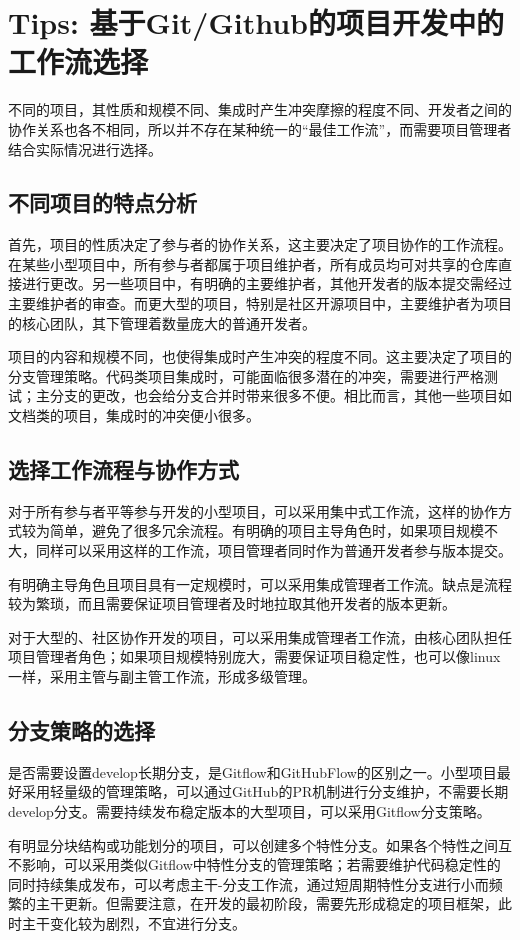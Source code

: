 \documentclass[../main.tex]{subfiles}
\begin{document}
\section{Tips: 基于Git/Github的项目开发中的工作流选择}

不同的项目，其性质和规模不同、集成时产生冲突摩擦的程度不同、开发者之间的协作关系也各不相同，所以并不存在某种统一的“最佳工作流”，而需要项目管理者结合实际情况进行选择。

\subsection{不同项目的特点分析}

首先，项目的性质决定了参与者的协作关系，这主要决定了项目协作的工作流程。在某些小型项目中，所有参与者都属于项目维护者，所有成员均可对共享的仓库直接进行更改。另一些项目中，有明确的主要维护者，其他开发者的版本提交需经过主要维护者的审查。而更大型的项目，特别是社区开源项目中，主要维护者为项目的核心团队，其下管理着数量庞大的普通开发者。

项目的内容和规模不同，也使得集成时产生冲突的程度不同。这主要决定了项目的分支管理策略。代码类项目集成时，可能面临很多潜在的冲突，需要进行严格测试；主分支的更改，也会给分支合并时带来很多不便。相比而言，其他一些项目如文档类的项目，集成时的冲突便小很多。

\subsection{选择工作流程与协作方式}

对于所有参与者平等参与开发的小型项目，可以采用集中式工作流，这样的协作方式较为简单，避免了很多冗余流程。有明确的项目主导角色时，如果项目规模不大，同样可以采用这样的工作流，项目管理者同时作为普通开发者参与版本提交。

有明确主导角色且项目具有一定规模时，可以采用集成管理者工作流。缺点是流程较为繁琐，而且需要保证项目管理者及时地拉取其他开发者的版本更新。

对于大型的、社区协作开发的项目，可以采用集成管理者工作流，由核心团队担任项目管理者角色；如果项目规模特别庞大，需要保证项目稳定性，也可以像linux一样，采用主管与副主管工作流，形成多级管理。

\subsection{分支策略的选择}

是否需要设置develop长期分支，是Gitflow和GitHubFlow的区别之一。小型项目最好采用轻量级的管理策略，可以通过GitHub的PR机制进行分支维护，不需要长期develop分支。需要持续发布稳定版本的大型项目，可以采用Gitflow分支策略。

有明显分块结构或功能划分的项目，可以创建多个特性分支。如果各个特性之间互不影响，可以采用类似Gitflow中特性分支的管理策略；若需要维护代码稳定性的同时持续集成发布，可以考虑主干-分支工作流，通过短周期特性分支进行小而频繁的主干更新。但需要注意，在开发的最初阶段，需要先形成稳定的项目框架，此时主干变化较为剧烈，不宜进行分支。
\end{document}
